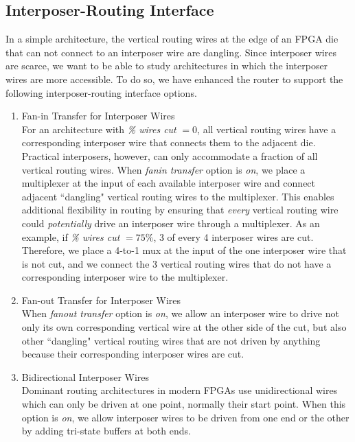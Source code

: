 \documentclass[journal]{IEEEtran}
\begin{document}
\subsection{Interposer-Routing Interface}
\label{sec:interposer-routing-interface}
In a simple architecture, the vertical routing wires at the edge of an FPGA die that can not connect to an interposer wire are dangling. Since interposer wires are scarce, we want to be able to study architectures in which the interposer wires are more accessible. To do so, we have enhanced the router to support the following interposer-routing interface options.

\begin{enumerate}
\item Fan-in Transfer for Interposer Wires\\
For an architecture with \textit{\% wires cut} $=0$, all vertical routing wires have a corresponding interposer wire that connects them to the adjacent die. Practical interposers, however, can only accommodate a fraction of all vertical routing wires. When \textit{fanin transfer} option is \textit{on}, we place a multiplexer at the input of each available interposer wire and connect adjacent ``dangling" vertical routing wires to the multiplexer. This enables additional flexibility in routing by ensuring that \textit{every} vertical routing wire could \textit{potentially} drive an interposer wire through a multiplexer. As an example, if \textit{\% wires cut} $=75\%$, 3 of every 4 interposer wires are cut. Therefore, we place a 4-to-1 mux at the input of the one interposer wire that is not cut, and we connect the 3 vertical routing wires that do not have a corresponding interposer wire to the multiplexer. 

\item Fan-out Transfer for Interposer Wires\\
When \textit{fanout transfer} option is \textit{on}, we allow an interposer wire to drive not only its own corresponding vertical wire at the other side of the cut, but also other ``dangling" vertical routing wires that are not driven by anything because their corresponding interposer wires are cut.

\item Bidirectional Interposer Wires\\
Dominant routing architectures in modern FPGAs use unidirectional wires~\cite{unidirectional, lewis2005stratix} which can only be driven at one point, normally their start point. When this option is \textit{on}, we allow interposer wires to be driven from one end or the other by adding tri-state buffers at both ends.
\end{enumerate}
\end{document}
